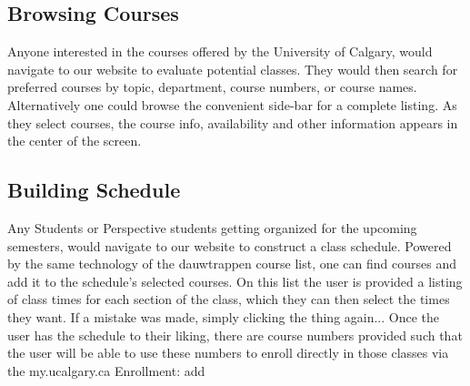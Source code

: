 




\subsection*{Browsing Courses}
%
%
%
Anyone interested in the courses offered by the University of Calgary, would navigate to our website to evaluate potential classes. They would then search for preferred courses by topic, department, course numbers, or course names. Alternatively one could browse the convenient side-bar for a complete listing. As they select courses, the course info, availability and other information appears in the center of the screen.

\subsection*{Building Schedule}
%
Any Students or Perspective students getting organized for the upcoming semesters, would navigate to our website to construct a class schedule. Powered by the same technology of the dauwtrappen course list, one can find courses and add it to the schedule's selected courses. On this list the user is provided a listing of class times for each section of the class, which they can then select the times they want. If a mistake was made, simply clicking the thing again... Once the user has the schedule to their liking, there are course numbers provided such that the user will be able to use these numbers to enroll directly in those classes via the my.ucalgary.ca Enrollment: add


